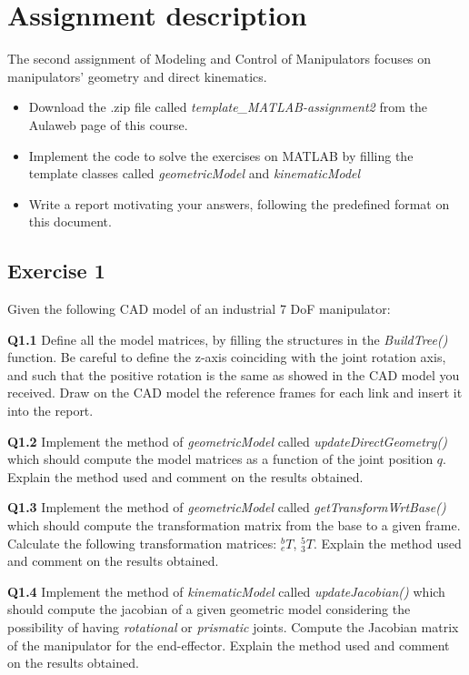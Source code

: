 \section{Assignment description}
The second assignment of Modeling and Control of Manipulators focuses on manipulators' geometry and direct kinematics. 

\begin{itemize}
    \item Download the .zip file called \textit{template\_MATLAB-assignment2} from the Aulaweb page of this course.
    \item Implement the code to solve the exercises on MATLAB by filling the template classes called \textit{geometricModel} and \textit{kinematicModel}
    \item Write a report motivating your answers, following the predefined format on this document.
\end{itemize}

\subsection{Exercise 1}
 Given the following CAD model of an industrial 7 DoF manipulator:
 
\textbf{Q1.1} Define all the model matrices, by filling the structures in the \textit{BuildTree()} function. Be careful to define the z-axis coinciding with the joint rotation axis, and such that the positive rotation is the same as showed in the CAD model you received. Draw on the CAD model the reference frames for each link and insert it into the report.

\textbf{Q1.2} Implement the method of \textit{geometricModel} called \textit{updateDirectGeometry()} which should compute the model matrices as a function of the joint position $q$. Explain the method used and comment on the results obtained.

\textbf{Q1.3} Implement the method of \textit{geometricModel} called \textit{getTransformWrtBase()} which should compute the transformation matrix from the base to a given frame. Calculate the following transformation matrices: $^b_e T$, $^5_3 T$. Explain the method used and comment on the results obtained.

\textbf{Q1.4} Implement the method of \textit{kinematicModel} called \textit{updateJacobian()} which should compute the jacobian of a given geometric model considering the possibility of having \textit{rotational} or \textit{prismatic} joints. Compute the Jacobian matrix of the manipulator for the end-effector. Explain the method used and comment on the results obtained.

